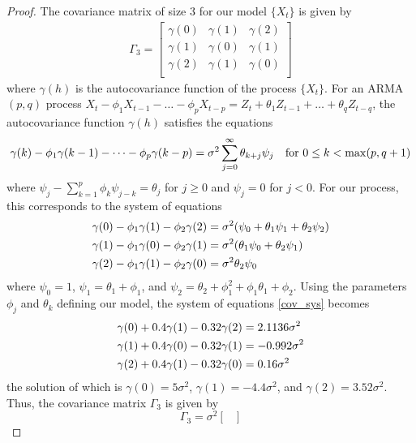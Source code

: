 \documentclass[12pt]{article}
\theoremstyle{definition}
\begin{document}
\begin{proof}
  The covariance matrix of size 3 for our model $\{X_t\}$ is given by
  \begin{align*}
    \Gamma_3 =
    \begin{bmatrix}
      \gamma(0) & \gamma(1) & \gamma(2) \\
      \gamma(1) & \gamma(0) & \gamma(1) \\
      \gamma(2) & \gamma(1) & \gamma(0) \\
    \end{bmatrix}
  \end{align*}
  where $\gamma(h)$ is the autocovariance function of the process $\{X_t\}$. For an ARMA$(p, q)$
  process $X_t -\phi_1 X_{t-1} - \dots - \phi_p X_{t-p} = Z_t + \theta_1 Z_{t-1} + \dots + \theta_q Z_{t-q}$,
  the autocovariance function $\gamma(h)$ satisfies the equations
  \[
    \gamma(k) - \phi_1 \gamma(k-1) - \dots - \phi_p \gamma(k-p) = \sigma^2 \sum_{j=0}^\infty \theta_{k+j}\psi_j \text{\quad for $0 \leq k < \max(p, q+1)$}
  \]
  where $\psi_j - \sum_{k=1}^p \phi_k \psi_{j-k} = \theta_j$ for $j \geq 0$ and $\psi_j = 0$ for $j < 0$.
  For our process,  this corresponds to the system of equations
  \begin{align}\label{cov_sys}
    \gamma(0) - \phi_1 \gamma(1) - \phi_2 \gamma(2) &= \sigma^2 (\psi_0 + \theta_1\psi_1 + \theta_2\psi_2) \notag \\
    \gamma(1) - \phi_1 \gamma(0) - \phi_2 \gamma(1) &= \sigma^2 (\theta_1\psi_0 + \theta_2\psi_1) \\
    \gamma(2) - \phi_1 \gamma(1) - \phi_2 \gamma(0) &= \sigma^2 \theta_2\psi_0 \notag
  \end{align}
  where $\psi_0 = 1$, $\psi_1 = \theta_1 + \phi_1$, and $\psi_2 = \theta_2 + \phi_1^2 + \phi_1\theta_1 + \phi_2$.
  Using the parameters $\phi_j$ and $\theta_k$ defining our model, the system of equations \eqref{cov_sys} becomes
  \begin{align*}
    \gamma(0) + 0.4 \gamma(1) - 0.32 \gamma(2) &= 2.1136\sigma^2\\ \notag
    \gamma(1) + 0.4 \gamma(0) - 0.32 \gamma(1) &= -0.992 \sigma^2 \\
    \gamma(2) + 0.4 \gamma(1) - 0.32 \gamma(0) &= 0.16 \sigma^2 \notag
  \end{align*}
  the solution of which is $\gamma(0) = 5 \sigma^2$, $\gamma(1) = -4.4 \sigma^2$,
  and $\gamma(2) = 3.52 \sigma^2$. Thus, the covariance matrix $\Gamma_3$ is given by
  \[
    \Gamma_3 =
    \sigma^2
    \begin{bmatrix}

\end{bmatrix}\]
\end{proof}
\end{document}
